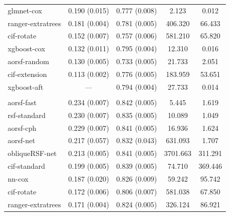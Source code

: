 \documentclass[twoside,11pt]{article}\usepackage[]{graphicx}\usepackage[]{xcolor}
\newenvironment{knitrout}{}{} %
\begin{document}
\begin{knitrout}
\begin{longtable}[t]{lcccc}
\hspace{1em}glmnet-cox & 0.190 (0.015) & 0.777 (0.008) & 2.123 & 0.012\\
\hspace{1em}ranger-extratrees & 0.181 (0.004) & 0.781 (0.005) & 406.320 & 66.433\\
\hspace{1em}cif-rotate & 0.152 (0.007) & 0.757 (0.006) & 581.210 & 65.820\\
\hspace{1em}xgboost-cox & 0.132 (0.011) & 0.795 (0.004) & 12.310 & 0.016\\
\hspace{1em}aorsf-random & 0.130 (0.005) & 0.733 (0.005) & 21.733 & 2.051\\
\hspace{1em}cif-extension & 0.113 (0.002) & 0.776 (0.005) & 183.959 & 53.651\\
\hspace{1em}xgboost-aft & --- & 0.794 (0.004) & 27.733 & 0.014\\
\addlinespace[0.3em]
\multicolumn{5}{l}{\textit{\textbf{ARIC; heart failure, n = 13623, p = 41}}}\\
\hline
\hspace{1em}aorsf-fast & 0.234 (0.007) & 0.842 (0.005) & 5.445 & 1.619\\
\hspace{1em}rsf-standard & 0.230 (0.007) & 0.835 (0.005) & 10.089 & 1.049\\
\hspace{1em}aorsf-cph & 0.229 (0.007) & 0.841 (0.005) & 16.936 & 1.624\\
\hspace{1em}aorsf-net & 0.217 (0.057) & 0.832 (0.043) & 631.093 & 1.707\\
\hspace{1em}obliqueRSF-net & 0.213 (0.005) & 0.841 (0.005) & 3701.663 & 311.291\\
\hspace{1em}cif-standard & 0.199 (0.005) & 0.839 (0.005) & 74.710 & 369.446\\
\hspace{1em}nn-cox & 0.187 (0.020) & 0.826 (0.009) & 59.242 & 95.742\\
\hspace{1em}cif-rotate & 0.172 (0.006) & 0.806 (0.007) & 581.038 & 67.850\\
\hspace{1em}ranger-extratrees & 0.171 (0.004) & 0.824 (0.005) & 326.124 & 86.921\\

\end{longtable}
\end{knitrout}
\end{document}
